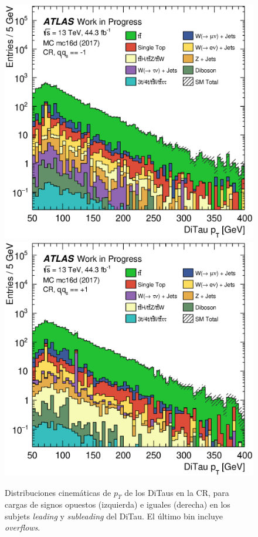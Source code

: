\let\oldthefigure\thefigure
\begin{figure}[th!]
    \centering
    \setlength{\individualPlotWidth}{0.47\fulllinewidth}
    \includegraphics[width=\individualPlotWidth]{Assets/Plots/qq-sign/qq==-1/h_stack_mc16d_ditau_pt.eps}
    \hspace{1em}
    \includegraphics[width=\individualPlotWidth]{Assets/Plots/qq-sign/qq==+1/h_stack_mc16d_ditau_pt.eps}

    \caption{Distribuciones cinemáticas de $p_T$ de los DiTaus en la CR, para cargas de signos opuestos (izquierda) e iguales (derecha) en los subjets \textit{leading} y \textit{subleading} del DiTau. El último bin incluye \textit{overflows}.}
    \label{fig:ch5:CR-qq_distributions_2}
\end{figure}





